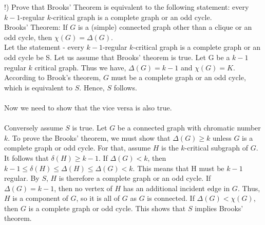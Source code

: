 \documentclass[12pt]{article}
\newenvironment{question}[2][Question]{\begin{trivlist}
\item[\hskip \labelsep {\bfseries #1}\hskip \labelsep {\bfseries #2.}]}{\end{trivlist}}
\begin{document}
\begin{question}{5}
(!) Prove that Brooks' Theorem is equivalent to the following statement: every $k-1$-regular $k$-critical graph is a complete graph or an odd cycle.\\

Brooks' Theorem:
If $G$ is a (simple) connected graph other than a clique or an odd cycle, then $\chi(G) = \Delta(G)$. \\

Let the statement - every $k-1$-regular $k$-critical graph is a complete graph or an odd cycle be S. Let us assume that Brooks' theorem is true.
Let G be a $k-1$ regular $k$ critical graph. Thus we have, $\Delta (G) = k-1$ and $\chi (G) = K$. According to Brook's theorem, $G$ must be a complete graph or an odd cycle, which is equivalent to $S$. Hence, $S$ follows. \\ \\
Now we need to show that the vice versa is also true. \\ \\
Conversely assume $S$ is true. Let $G$ be a connected graph with chromatic number $k$. To prove the Brooks' theorem, we must show that $\Delta(G) \geq k$ unless $G$ is a complete graph or odd cycle. For that, assume $H$ is the $k$-critical subgraph of $G$. It follows that $\delta (H) \geq k-1$. If $\Delta(G) < k$, then $k- 1 \leq \delta(H) \leq \Delta(H) \leq \Delta(G) < k$. This means that H must be $k-1$ regular. By $S$, $H$ is therefore a complete graph or an odd cycle. If $\Delta(G)  = k-1$, then no vertex of $H$ has an additional incident edge in $G$. Thus, $H$ is a component of $G$, so it is all of $G$ as $G$ is connected. If $\Delta (G) < \chi (G)$, then $G$ is a complete graph or odd cycle. This shows that $S$ implies Brooks' theorem.


\end{question}





\end{document}

